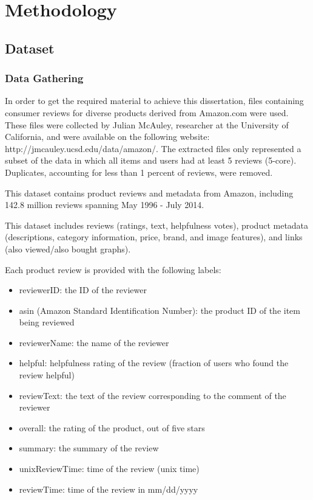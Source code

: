 \chapter{Methodology}

\section{Dataset}

\subsection{Data Gathering}
In order to get the required material to achieve this dissertation, files containing consumer reviews for diverse products derived from Amazon.com were used. These files were collected by Julian McAuley, researcher at the University of California, and were available on the following website: http://jmcauley.ucsd.edu/data/amazon/. The extracted files only represented a subset of the data in which all items and users had at least 5 reviews (5-core). Duplicates, accounting for less than 1 percent of reviews, were removed.

This dataset contains product reviews and metadata from Amazon, including 142.8 million reviews spanning May 1996 - July 2014.

This dataset includes reviews (ratings, text, helpfulness votes), product metadata (descriptions, category information, price, brand, and image features), and links (also viewed/also bought graphs). 

Each product review is provided with the following labels:
\begin{itemize}
\item reviewerID: the ID of the reviewer
\item asin (Amazon Standard Identification Number): the product ID of the item being
reviewed
\item reviewerName: the name of the reviewer
\item helpful: helpfulness rating of the review (fraction of users who found the review helpful)
\item reviewText: the text of the review corresponding to the comment of the reviewer
\item overall: the rating of the product, out of five stars
\item summary: the summary of the review
\item unixReviewTime: time of the review (unix time)
\item reviewTime: time of the review in mm/dd/yyyy
\end{itemize}

